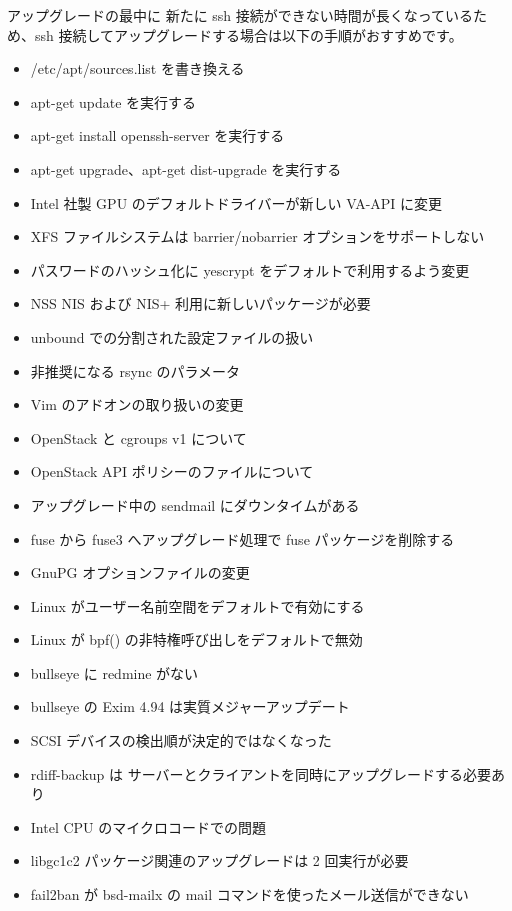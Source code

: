 \documentclass[mingoth,a4paper]{jsarticle}
\begin{document}
アップグレードの最中に 新たに ssh 接続ができない時間が長くなっているため、ssh 接続してアップグレードする場合は以下の手順がおすすめです。

\begin{itemize}
\item /etc/apt/sources.list を書き換える
\item apt-get update を実行する
\item apt-get install openssh-server を実行する
\item apt-get upgrade、apt-get dist-upgrade を実行する
\end{itemize}




\begin{itemize}
\item Intel 社製 GPU のデフォルトドライバーが新しい VA-API に変更
\item XFS ファイルシステムは barrier/nobarrier オプションをサポートしない
\item パスワードのハッシュ化に yescrypt をデフォルトで利用するよう変更
\item NSS NIS および NIS+ 利用に新しいパッケージが必要
\item unbound での分割された設定ファイルの扱い
\item 非推奨になる rsync のパラメータ
\item Vim のアドオンの取り扱いの変更
\item OpenStack と cgroups v1 について
\item OpenStack API ポリシーのファイルについて
\item アップグレード中の sendmail にダウンタイムがある
\item fuse から fuse3 へアップグレード処理で fuse パッケージを削除する
\item GnuPG オプションファイルの変更
\item Linux がユーザー名前空間をデフォルトで有効にする
\item Linux が bpf() の非特権呼び出しをデフォルトで無効
\item bullseye に redmine がない
\item bullseye の Exim 4.94 は実質メジャーアップデート
\item SCSI デバイスの検出順が決定的ではなくなった
\item rdiff-backup は サーバーとクライアントを同時にアップグレードする必要あり
\item Intel CPU のマイクロコードでの問題
\item libgc1c2 パッケージ関連のアップグレードは 2 回実行が必要
\item fail2ban が bsd-mailx の mail コマンドを使ったメール送信ができない
\end{itemize}
\end{document}
